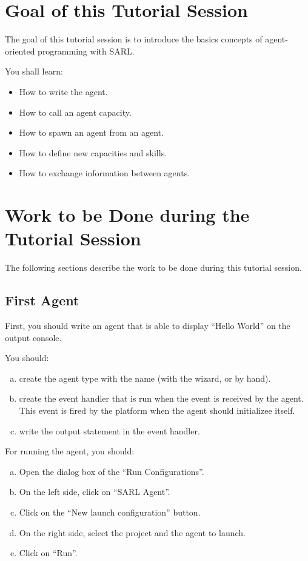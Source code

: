 \documentclass[english]{utbmciadreport}
\begin{document}
\section{Goal of this Tutorial Session}

The goal of this tutorial session is to introduce the basics concepts of agent-oriented programming with SARL.

You shall learn: 
\begin{itemize}
\item How to write the agent.
\item How to call an agent capacity.
\item How to spawn an agent from an agent.
\item How to define new capacities and skills.
\item How to exchange information between agents.
\end{itemize}

%

\section{Work to be Done during the Tutorial Session}

The following sections describe the work to be done during this tutorial session.

\subsection{First Agent}

First, you should write an agent that is able to display ``Hello World'' on the output console.

You should:
\begin{enumerate}[a)]
\item create the agent type with the name  (with the wizard, or by hand).
\item create the event handler that is run when the  event is received by the agent. This event is fired by the platform when the agent should initializee itself.
\item write the output statement in the event handler.
\end{enumerate}

For running the agent, you should:
\begin{enumerate}[a)]
\item Open the dialog box of the ``Run Configurations''.
\item On the left side, click on ``SARL Agent''.
\item Click on the ``New launch configuration'' button.
\item On the right side, select the project and the agent to launch.
\item Click on ``Run''.
\end{enumerate}
\end{document}
